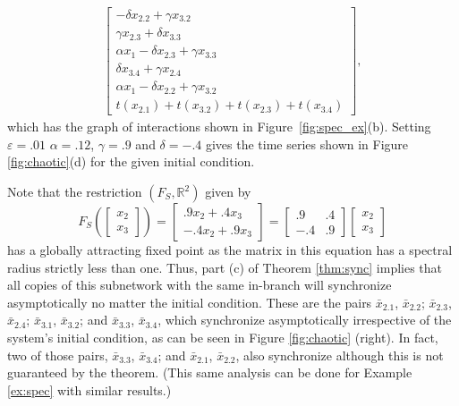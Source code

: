 \documentclass[12pt]{thesis}
\begin{document}
\begin{example}
\begin{align*}
\begin{bmatrix}
        -\delta x_{2.2} + \gamma x_{3.2} \\
        \gamma x_{2.3} + \delta x_{3.3} \\
        \alpha x_1 - \delta x_{2.3} + \gamma x_{3.3} \\
        \delta x_{3.4} + \gamma x_{2.4} \\
        \alpha x_1 - \delta x_{2.2} + \gamma x_{3.2} \\
        t(x_{2.1}) + t(x_{3.2}) + t(x_{2.3}) + t(x_{3.4})
    \end{bmatrix},
\end{align*}
which has the graph of interactions shown in Figure~\ref{fig:spec_ex}(b).
Setting $\varepsilon=.01$ $\alpha=.12$, $\gamma=.9$ and $\delta=-.4$ gives the time series shown in Figure \ref{fig:chaotic}(d) for the given initial condition.

Note that the restriction $(F_S,\mathbb{R}^2)$ given by
\begin{equation*}
    F_S\left(\begin{bmatrix} x_2 \\ x_3 \end{bmatrix}\right) = \begin{bmatrix} .9x_2 + .4x_3 \\ -.4x_2 + .9x_3 \end{bmatrix} = \begin{bmatrix} .9 & .4 \\ -.4 & .9 \end{bmatrix}\begin{bmatrix} x_2 \\ x_3 \end{bmatrix}
\end{equation*}
has a globally attracting fixed point as the matrix in this equation has a spectral radius strictly less than one.
Thus, part (c) of Theorem \ref{thm:sync} implies that all copies of this subnetwork with the same in-branch will synchronize asymptotically no matter the initial condition.
These are the pairs $\bar{x}_{2.1}$, $\bar{x}_{2.2}$; $\bar{x}_{2.3}$, $\bar{x}_{2.4}$; $\bar{x}_{3.1}$, $\bar{x}_{3.2}$; and $\bar{x}_{3.3}$, $\bar{x}_{3.4}$, which synchronize asymptotically irrespective of the system's initial condition, as can be seen in Figure \ref{fig:chaotic} (right).
In fact, two of those pairs, $\bar{x}_{3.3}$, $\bar{x}_{3.4}$; and $\bar{x}_{2.1}$, $\bar{x}_{2.2}$, also synchronize although this is not guaranteed by the theorem.
(This same analysis can be done for Example \ref{ex:spec} with similar results.)
 

\end{example}
\end{document}

